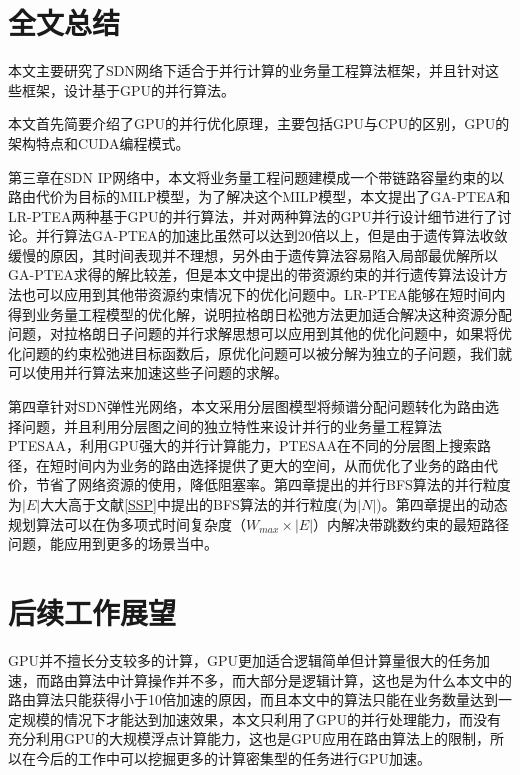 \documentclass[master]{thesis-uestc}
\begin{document}
\section{全文总结}
本文主要研究了SDN网络下适合于并行计算的业务量工程算法框架，并且针对这些框架，设计基于GPU的并行算法。

本文首先简要介绍了GPU的并行优化原理，主要包括GPU与CPU的区别，GPU的架构特点和CUDA编程模式。

第三章在SDN IP网络中，本文将业务量工程问题建模成一个带链路容量约束的以路由代价为目标的MILP模型，为了解决这个MILP模型，本文提出了GA-PTEA和LR-PTEA两种基于GPU的并行算法，并对两种算法的GPU并行设计细节进行了讨论。并行算法GA-PTEA的加速比虽然可以达到20倍以上，但是由于遗传算法收敛缓慢的原因，其时间表现并不理想，另外由于遗传算法容易陷入局部最优解所以GA-PTEA求得的解比较差，但是本文中提出的带资源约束的并行遗传算法设计方法也可以应用到其他带资源约束情况下的优化问题中。LR-PTEA能够在短时间内得到业务量工程模型的优化解，说明拉格朗日松弛方法更加适合解决这种资源分配问题，对拉格朗日子问题的并行求解思想可以应用到其他的优化问题中，如果将优化问题的约束松弛进目标函数后，原优化问题可以被分解为独立的子问题，我们就可以使用并行算法来加速这些子问题的求解。

第四章针对SDN弹性光网络，本文采用分层图模型将频谱分配问题转化为路由选择问题，并且利用分层图之间的独立特性来设计并行的业务量工程算法PTESAA，利用GPU强大的并行计算能力，PTESAA在不同的分层图上搜索路径，在短时间内为业务的路由选择提供了更大的空间，从而优化了业务的路由代价，节省了网络资源的使用，降低阻塞率。第四章提出的并行BFS算法的并行粒度为$|E|$大大高于文献\ref{SSP}中提出的BFS算法的并行粒度(为$|N|$)。第四章提出的动态规划算法可以在伪多项式时间复杂度（$W_{max}\times|E|$）内解决带跳数约束的最短路径问题，能应用到更多的场景当中。

\section{后续工作展望}
GPU并不擅长分支较多的计算，GPU更加适合逻辑简单但计算量很大的任务加速，而路由算法中计算操作并不多，而大部分是逻辑计算，这也是为什么本文中的路由算法只能获得小于10倍加速的原因，而且本文中的算法只能在业务数量达到一定规模的情况下才能达到加速效果，本文只利用了GPU的并行处理能力，而没有充分利用GPU的大规模浮点计算能力，这也是GPU应用在路由算法上的限制，所以在今后的工作中可以挖掘更多的计算密集型的任务进行GPU加速。
\end{document}
